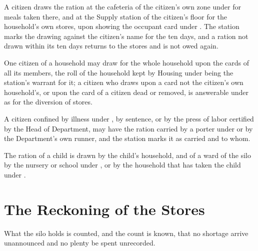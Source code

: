 \begin{clauses}
\item A citizen draws the ration at the cafeteria of the citizen's own zone under  for meals taken there, and at the Supply station of the citizen's floor for the household's own stores, upon showing the occupant card under . The station marks the drawing against the citizen's name for the ten days, and a ration not drawn within its ten days returns to the stores and is not owed again.
\item One citizen of a household may draw for the whole household upon the cards of all its members, the roll of the household kept by Housing under  being the station's warrant for it; a citizen who draws upon a card not the citizen's own household's, or upon the card of a citizen dead or removed, is answerable under  as for the diversion of stores.
\item A citizen confined by illness under , by sentence, or by the press of labor certified by the Head of Department, may have the ration carried by a porter under  or by the Department's own runner, and the station marks it as carried and to whom.
\item The ration of a child is drawn by the child's household, and of a ward of the silo by the nursery or school under , or by the household that has taken the child under .
\end{clauses}

\section{The Reckoning of the Stores}
\label{sec:supply:reckoning-of-the-stores}

What the silo holds is counted, and the count is known, that no shortage arrive unannounced and no plenty be spent unrecorded.

